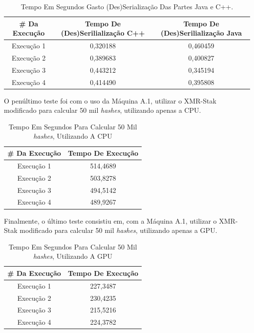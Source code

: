 \begin {table}[H]
\begin{center}
	\begin{tabular}{ |c|c|c| } 
		\hline
		\#  Da Execução & Tempo De (Des)Serilialização C++ & Tempo De (Des)Serilialização Java \\ 
		\hline
		Execução 1 & 0,320188 & 0,460459 \\ 
		\hline
		Execução 2 & 0,389683 & 0,400827 \\ 
		\hline
		Execução 3 & 0,443212 & 0,345194 \\ 
		\hline
		Execução 4 & 0,414490 & 0,395808 \\ 
		\hline
	\end{tabular}
	\caption {Tempo Em Segundos Gasto (Des)Serialização Das Partes Java e C++.} \label{TabelaTempoEscalonadorNovo3} 
\end{center}
\end {table}

O penúltimo teste foi com o uso da Máquina A.1, utilizar o XMR-Stak modificado para calcular 50 mil \textit{hashes}, utilizando apenas a \acrshort{CPU}.

\begin {table}[H]
\begin{center}
	\begin{tabular}{ |c|c| } 
		\hline
		\#  Da Execução & Tempo De Execução \\ 
		\hline
		Execução 1 & 514,4689 \\ 
		\hline
		Execução 2 & 503,8278 \\ 
		\hline
		Execução 3 & 494,5142 \\ 
		\hline
		Execução 4 & 489,9267 \\ 
		\hline
	\end{tabular}
	\caption {Tempo Em Segundos Para Calcular 50 Mil \textit{hashes}, Utilizando A \acrshort{CPU}} \label{TabelaTempoXMR-Stak-CPU} 
\end{center}
\end {table}

Finalmente, o último teste consistiu em, com a Máquina A.1, utilizar o XMR-Stak modificado para calcular 50 mil \textit{hashes}, utilizando apenas a \acrshort{GPU}.

\begin {table}[H]
\begin{center}
	\begin{tabular}{ |c|c| } 
		\hline
		\#  Da Execução & Tempo De Execução \\ 
		\hline
		Execução 1 & 227,3487 \\ 
		\hline
		Execução 2 & 230,4235 \\ 
		\hline
		Execução 3 & 215,5216 \\ 
		\hline
		Execução 4 & 224,3782 \\ 
		\hline
	\end{tabular}
	\caption {Tempo Em Segundos Para Calcular 50 Mil \textit{hashes}, Utilizando A \acrshort{GPU}} \label{TabelaTempoXMR-Stak-GPU} 
\end{center}
\end {table}

